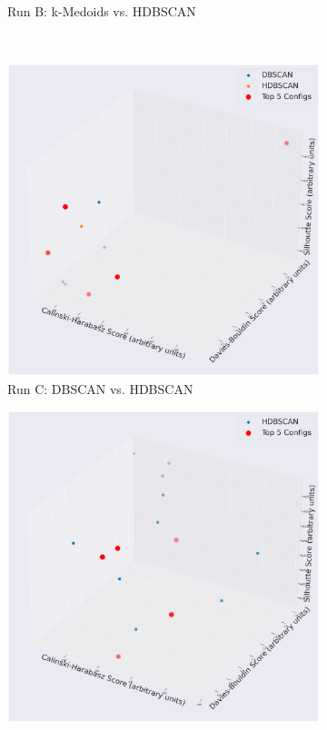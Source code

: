 \documentclass[10pt,oneside]{report}
\begin{document}
\begin{figure}[H]
\begin{subfigure}[b]{0.48\textwidth}
        \caption{Run B: k-Medoids vs. HDBSCAN}
        \label{fig:nomic_kmedoids_vs_hdbscan_h2h_config}
    \end{subfigure}
    \\
    \vspace{1em}
    \begin{subfigure}[b]{0.48\textwidth}
        \centering
        \includegraphics[width=\textwidth]{./images/nomic_dbscanvshdbscan.png}
        \caption{Run C: DBSCAN vs. HDBSCAN}
        \label{fig:nomic_dbscan_vs_hdbscan_h2h_config} 
    \end{subfigure}
    \hfill
    \begin{subfigure}[b]{0.48\textwidth}
        \centering
        \includegraphics[width=\textwidth]{./images/nomic_hdbscan.png}

\end{subfigure}
\end{figure}
\end{document}
